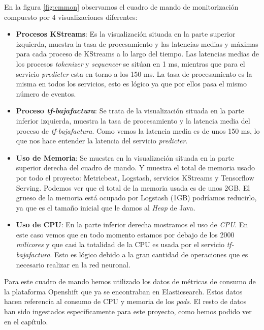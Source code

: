 En la figura \ref{fig:cmmon} observamos el cuadro de mando de monitorización compuesto por 4 visualizaciones diferentes: 

\begin{itemize}
\item \textbf{Procesos KStreams}: Es la visualización situada en la parte superior izquierda, muestra la tasa de procesamiento y  las latencias medias y máximas para cada proceso de KStreams a lo largo del tiempo. Las latencias medias de los procesos \textit{tokenizer} y \textit{sequencer} se sitúan en 1 ms, mientras que para el servicio \textit{predicter} esta en torno a los 150 ms. La tasa de procesamiento es la misma en todos los servicios, esto es lógico ya que por ellos pasa el mismo número de eventos.

\item \textbf{Proceso \textit{tf-bajafactura}}: Se trata de la visualización situada en la parte inferior izquierda, muestra la tasa de procesamiento y  la latencia media del proceso de \textit{tf-bajafactura}. Como vemos la latencia media es de unos 150 ms, lo que nos hace entender la latencia del servicio \textit{predicter}.
  
\item \textbf{Uso de Memoria}: Se muestra en la visualización situada en la parte superior derecha del cuadro de mando. Y muestra el total de memoria usado por todo el proyecto: Metricbeat, Logstash, servicios KStreams y Tensorflow Serving. Podemos ver que el total de la memoria usada es de unos 2GB. El grueso de la memoria está ocupado por Logstash (1GB) podríamos reducirlo, ya que es el tamaño inicial que le damos al \textit{Heap} de Java. 


\item \textbf{Uso de CPU}: En la parte inferior derecha mostramos el uso de \textit{CPU}. En este caso vemos que en todo momento estamos por debajo de los 2000 \textit{milicores} y que casi la totalidad de la CPU es usada por el servicio \textit{tf-bajafactura}. Esto es lógico debido a la gran cantidad de operaciones que es necesario realizar en la red neuronal. 

\end{itemize}


Para este cuadro de mando hemos utilizado los datos de métricas de consumo de la plataforma Openshift que ya se encontraban en Elasticsearch. Estos datos hacen referencia al consumo de CPU y memoria de los \textit{pods}. El resto de datos han sido ingestados específicamente para este proyecto, como hemos podido ver en el capítulo. 



